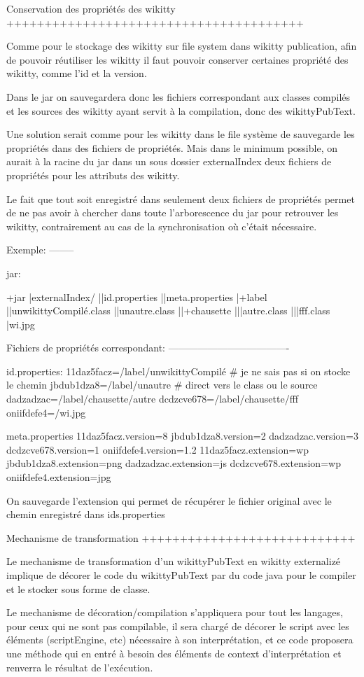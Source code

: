 Conservation des propriétés des wikitty
+++++++++++++++++++++++++++++++++++++++

Comme pour le stockage des wikitty sur file system dans wikitty publication, 
afin de pouvoir réutiliser les wikitty il faut pouvoir conserver certaines 
propriété des wikitty, comme l'id et la version.

Dans le jar on sauvegardera donc les fichiers correspondant aux classes 
compilés et les sources des wikitty ayant servit à la compilation, donc des
wikittyPubText. 

Une solution serait comme pour les wikitty dans le file système de sauvegarde
les propriétés dans des fichiers de propriétés. Mais dans le minimum possible,
on aurait à la racine du jar dans un sous dossier externalIndex deux fichiers de 
propriétés pour les attributs des wikitty.

Le fait que tout soit enregistré dans seulement deux fichiers de propriétés 
permet de ne pas avoir à chercher dans toute l'arborescence du jar pour 
retrouver les wikitty, contrairement au cas de la synchronisation où c'était 
nécessaire.

Exemple:
--------


jar:

+jar
|externalIndex/
||id.properties
||meta.properties
|+label
||unwikittyCompilé.class
||unautre.class    
||+chausette
|||autre.class
|||fff.class
|wi.jpg

Fichiers de propriétés correspondant:
-------------------------------------

id.properties:
11daz5facz=/label/unwikittyCompilé # je ne sais pas si on stocke le chemin
jbdub1dza8=/label/unautre         # direct vers le class ou le source
dadzadzac=/label/chausette/autre
dcdzcve678=/label/chausette/fff
oniifdefe4=/wi.jpg


meta.properties
11daz5facz.version=8
jbdub1dza8.version=2
dadzadzac.version=3
dcdzcve678.version=1
oniifdefe4.version=1.2
11daz5facz.extension=wp
jbdub1dza8.extension=png
dadzadzac.extension=js
dcdzcve678.extension=wp
oniifdefe4.extension=jpg

On sauvegarde l'extension qui permet de récupérer le fichier original avec le
chemin enregistré dans ids.properties

Mechanisme de transformation
++++++++++++++++++++++++++++

Le mechanisme de transformation d'un wikittyPubText en wikitty externalizé 
implique de décorer le code du wikittyPubText par du code java pour le compiler 
et le stocker sous forme de classe.

Le mechanisme de décoration/compilation s'appliquera pour tout les langages, 
pour ceux qui ne sont pas compilable, il sera chargé de décorer le script
avec les éléments (scriptEngine, etc) nécessaire à son interprétation,
et ce code proposera une méthode qui en entré à besoin des éléments de context
d'interprétation et renverra le résultat de l'exécution.



